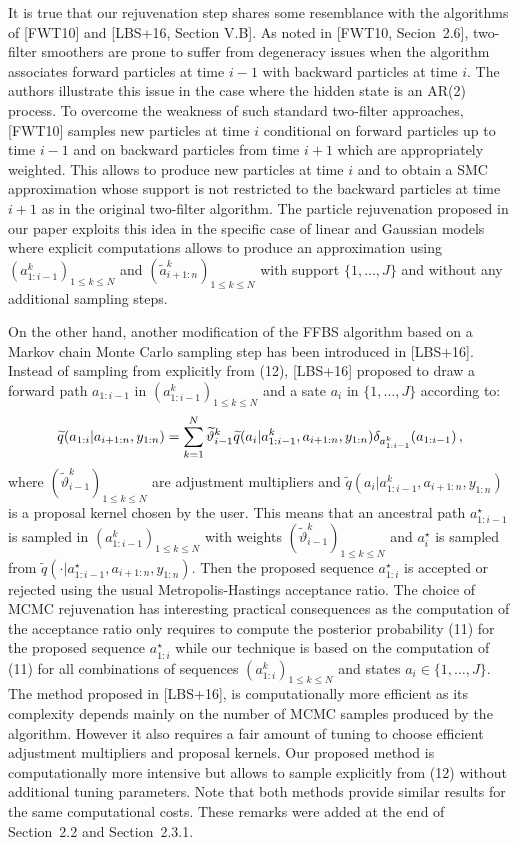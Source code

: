 {\em 

It is true that our rejuvenation step shares some resemblance with the algorithms of [FWT10] and [LBS+16, Section V.B]. As noted in [FWT10, Secion~2.6], two-filter smoothers are prone to suffer from degeneracy issues when the algorithm associates forward particles at time $i-1$ with backward particles at time $i$. The authors illustrate this issue in the case where the hidden state is an AR(2) process. To overcome the weakness of such standard two-filter approaches, [FWT10] samples new particles at time $i$ conditional on forward particles up to time $i-1$ and on backward particles from time $i+1$ which are appropriately weighted. This allows to produce new particles at time $i$ and to obtain a SMC approximation whose support is not restricted to the backward particles at time $i+1$ as in the original two-filter algorithm.  The particle rejuvenation proposed in our paper exploits this idea in the specific case of linear and Gaussian models where explicit computations allows to produce an approximation using $(a^k_{1:i-1})_{1\le k \le N}$ and $(\tilde{a}^k_{i+1:n})_{1\le k \le N}$ with support $\{1,\ldots,J\}$ and without any additional sampling steps.


On the other hand, another modification of the FFBS algorithm based on a Markov chain Monte Carlo sampling step has been introduced in [LBS+16]. Instead of sampling from  explicitly from (12), [LBS+16] proposed to draw a forward path $a_{1:i-1}$ in $(a^k_{1:i-1})_{1\le k \le N}$ and a sate $a_i$ in $\{1,\ldots,J\}$ according to:
\[
\widetilde{q}(a_{1:i}|a_{i+1:n},y_{1:n}) = \sum_{k=1}^N \widetilde{\vartheta}^k_{i-1}\widetilde{q}(a_{i}|a^k_{1:i-1},a_{i+1:n},y_{1:n})\delta_{a^k_{1:i-1}}(a_{1:i-1})\,,
\]
where $(\widetilde{\vartheta}^k_{i-1})_{1\le k \le N}$ are adjustment multipliers and $\widetilde{q}(a_{i}|a^k_{1:i-1},a_{i+1:n},y_{1:n})$ is a proposal kernel chosen by the user. This means that an ancestral path $a^{\star}_{1:i-1}$ is sampled in $(a^k_{1:i-1})_{1\le k \le N}$ with weights $(\widetilde{\vartheta}^k_{i-1})_{1\le k \le N}$ and $a^{\star}_i$ is sampled from $\widetilde{q}(\cdot|a^{\star}_{1:i-1},a_{i+1:n},y_{1:n})$. Then the proposed sequence $a^{\star}_{1:i}$ is accepted or rejected using the usual Metropolis-Hastings acceptance ratio. The choice of MCMC rejuvenation has interesting practical consequences as the computation of the acceptance ratio only requires to compute the posterior probability (11) for the proposed sequence $a^{\star}_{1:i}$ while our technique is based on the computation of  (11) for all combinations of sequences $(a^{k}_{1:i})_{1\le k \le N}$ and states $a_i\in\{1,\ldots,J\}$. The method proposed in [LBS+16], is computationally more efficient as its complexity depends mainly on the number of MCMC samples produced by the algorithm. However it also requires a fair amount of tuning to choose efficient adjustment multipliers and proposal kernels. Our proposed method is computationally more intensive but allows to sample explicitly from (12) without additional tuning parameters. Note that both methods provide similar results for the same computational costs.
These remarks were added at the end of Section~2.2 and Section~2.3.1.
}

